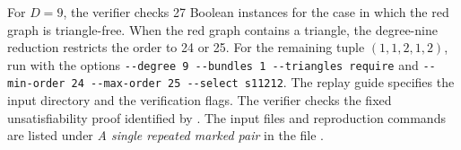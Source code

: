 For $D=9$, the verifier  checks 27 Boolean
instances for the case in which the red graph is triangle-free.
When the red graph contains a triangle, the degree-nine reduction
restricts the order to 24 or 25. For the remaining tuple
$(1,1,2,1,2)$, run  with the options
\verb|--degree 9 --bundles 1 --triangles require| and
\verb|--min-order 24 --max-order 25 --select s11212|. The replay
guide specifies the input directory and the verification flags.
The verifier checks the fixed unsatisfiability proof identified by
. The input files and reproduction
commands are listed under \emph{A single repeated marked pair} in the
file .
